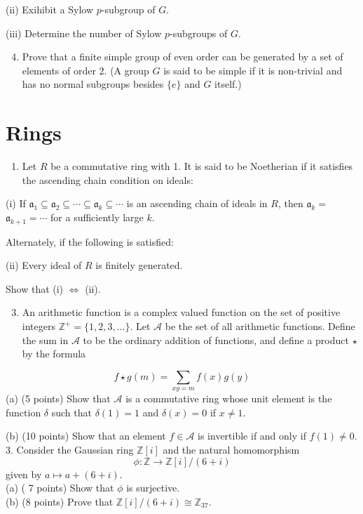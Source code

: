 \documentclass[10pt]{article}
\begin{document}
(ii) Exihibit a Sylow $p$-subgroup of $G$.

(iii) Determine the number of Sylow $p$-subgroups of $G$.

\begin{enumerate}
  \setcounter{enumi}{3}
  \item Prove that a finite simple group of even order can be generated by a set of elements of order 2. (A group $G$ is said to be simple if it is non-trivial and has no normal subgroups besides $\{e\}$ and $G$ itself.)
\end{enumerate}
\section{Rings}
\begin{enumerate}
  \item Let $R$ be a commutative ring with 1. It is said to be Noetherian if it satisfies the ascending chain condition on ideals:
\end{enumerate}
(i) If $\mathfrak{a}_{1} \subseteq \mathfrak{a}_{2} \subseteq \cdots \subseteq \mathfrak{a}_{k} \subseteq \cdots$ is an ascending chain of ideals in $R$, then $\mathfrak{a}_{k}=$ $\mathfrak{a}_{k+1}=\cdots$ for a sufficiently large $k$.

Alternately, if the following is satisfied:

(ii) Every ideal of $R$ is finitely generated.

Show that (i) $\Longleftrightarrow$ (ii).

\begin{enumerate}
  \setcounter{enumi}{2}
  \item An arithmetic function is a complex valued function on the set of positive integers $\mathbb{Z}^{+}=\{1,2,3, \ldots\}$. Let $\mathcal{A}$ be the set of all arithmetic functions. Define the sum in $\mathcal{A}$ to be the ordinary addition of functions, and define a product $\star$ by the formula
\end{enumerate}
$$
f \star g(m)=\sum_{x y=m} f(x) g(y)
$$
(a) (5 points) Show that $\mathcal{A}$ is a commutative ring whose unit element is the function $\delta$ such that $\delta(1)=1$ and $\delta(x)=0$ if $x \neq 1$.

(b) (10 points) Show that an element $f \in \mathcal{A}$ is invertible if and only if $f(1) \neq 0$. 3. Consider the Gaussian ring $\mathbb{Z}[i]$ and the natural homomorphism
$$
\phi: \mathbb{Z} \rightarrow \mathbb{Z}[i] /(6+i)
$$
given by $a \mapsto a+(6+i)$.\\
(a) ( 7 points) Show that $\phi$ is surjective.\\
(b) (8 points) Prove that $\mathbb{Z}[i] /(6+i) \cong \mathbb{Z}_{37}$.
\end{document}
